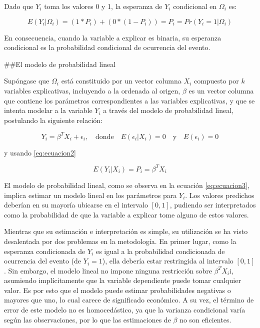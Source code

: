 \documentclass[
  12pt,
]{krantz}
\theoremstyle{definition}
\theoremstyle{definition}
\theoremstyle{definition}
\theoremstyle{remark}
\begin{document}
Dado que \(Y_i\) toma los valores 0 y 1, la esperanza de \(Y_i\) condicional en \(\Omega_i\) es:

\begin{equation}
E(Y_i|\Omega_i)=(1*P_i)+(0*(1-P_i))=P_i=Pr(Y_i=1|\Omega_i)
\label{eq:ecuacion2}
\end{equation}

En consecuencia, cuando la variable a explicar es binaria, su esperanza condicional es la probabilidad condicional de ocurrencia del evento.

\#\#El modelo de probabilidad lineal

Supóngase que \(\Omega_i\) está constituido por un vector columna \(X_i\) compuesto por \(k\) variables explicativas, incluyendo a la ordenada al origen, \(\beta\) es un vector columna que contiene los parámetros correspondientes a las variables explicativas, y que se intenta modelar a la variable \(Y_i\) a través del modelo de probabilidad lineal, postulando la siguiente relación:

\[Y_i=\beta^TX_i+\epsilon_i,\quad\textrm{donde}\quad E(\epsilon_i|X_i)=0\quad \textrm{y}\quad E(\epsilon_i)=0 
\label{eq:ecuacion3}\]

y usando \eqref{eq:ecuacion2}

\[E(Y_i|X_i)=P_i=\beta^TX_i
\label{eq:ecuacion4}\]

El modelo de probabilidad lineal, como se observa en la ecuación \eqref{eq:ecuacion3}, implica estimar un modelo lineal en los parámetros para \(Y_i\). Los valores predichos deberían en su mayoría ubicarse en el intervalo \([0,1]\), pudiendo ser interpretados como la probabilidad de que la variable a explicar tome alguno de estos valores.

Mientras que su estimación e interpretación es simple, su utilización se ha visto desalentada por dos problemas en la metodología. En primer lugar, como la esperanza condicionada de \(Y_i\) es igual a la probabilidad condicionada de ocurrencia del evento (de \(Y_i=1\)), ella debería estar restringida al intervalo \([0,1]\). Sin embargo, el modelo lineal no impone ninguna restricción sobre \(\beta^TX_i\)i, asumiendo implícitamente que la variable dependiente puede tomar cualquier valor. Es por esto que el modelo puede estimar probabilidades negativas o mayores que uno, lo cual carece de significado económico. A su vez, el término de error de este modelo no es homocedástico, ya que la varianza condicional varía según las observaciones, por lo que las estimaciones de \(\beta\) no son eficientes.
\end{document}
